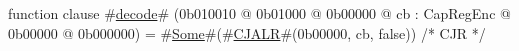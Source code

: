function clause #\hyperref[zdecode]{decode}# (0b010010 @ 0b01000 @ 0b00000    @ cb : CapRegEnc @ 0b00000 @ 0b000000) = #\hyperref[zSome]{Some}#(#\hyperref[zCJALR]{CJALR}#(0b00000, cb, false)) /* CJR */
